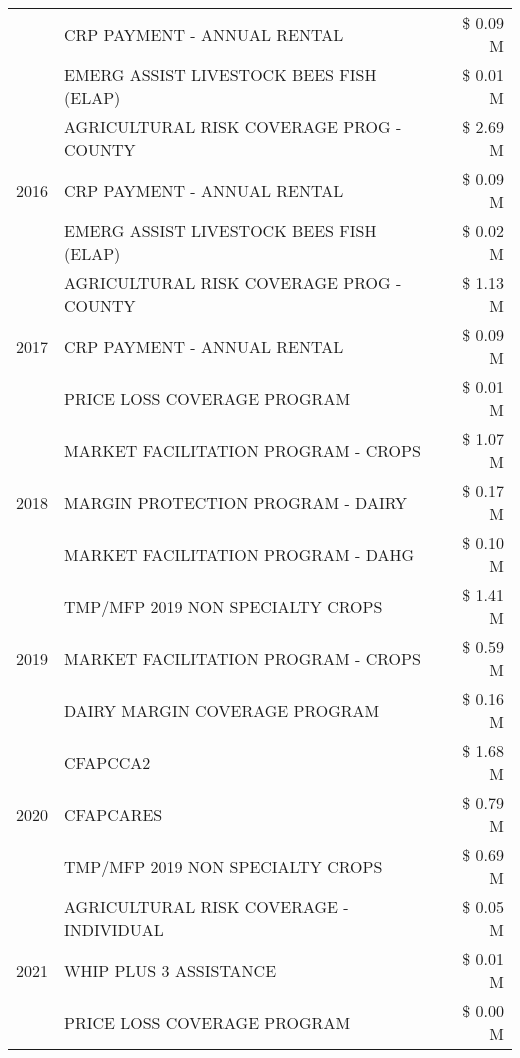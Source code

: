 \begin{tabular}{llr}
 & CRP PAYMENT - ANNUAL RENTAL & \$ 0.09 M \\
 & EMERG ASSIST LIVESTOCK BEES FISH (ELAP) & \$ 0.01 M \\
\cline{1-3}
\multirow[t]{3}{*}{2016} & AGRICULTURAL RISK COVERAGE PROG - COUNTY & \$ 2.69 M \\
 & CRP PAYMENT - ANNUAL RENTAL & \$ 0.09 M \\
 & EMERG ASSIST LIVESTOCK BEES FISH (ELAP) & \$ 0.02 M \\
\cline{1-3}
\multirow[t]{3}{*}{2017} & AGRICULTURAL RISK COVERAGE PROG - COUNTY & \$ 1.13 M \\
 & CRP PAYMENT - ANNUAL RENTAL & \$ 0.09 M \\
 & PRICE LOSS COVERAGE PROGRAM & \$ 0.01 M \\
\cline{1-3}
\multirow[t]{3}{*}{2018} & MARKET FACILITATION PROGRAM - CROPS & \$ 1.07 M \\
 & MARGIN PROTECTION PROGRAM - DAIRY & \$ 0.17 M \\
 & MARKET FACILITATION PROGRAM - DAHG & \$ 0.10 M \\
\cline{1-3}
\multirow[t]{3}{*}{2019} & TMP/MFP 2019 NON SPECIALTY CROPS & \$ 1.41 M \\
 & MARKET FACILITATION PROGRAM - CROPS & \$ 0.59 M \\
 & DAIRY MARGIN COVERAGE PROGRAM & \$ 0.16 M \\
\cline{1-3}
\multirow[t]{3}{*}{2020} & CFAPCCA2 & \$ 1.68 M \\
 & CFAPCARES & \$ 0.79 M \\
 & TMP/MFP 2019 NON SPECIALTY CROPS & \$ 0.69 M \\
\cline{1-3}
\multirow[t]{3}{*}{2021} & AGRICULTURAL RISK COVERAGE - INDIVIDUAL & \$ 0.05 M \\
 & WHIP PLUS 3 ASSISTANCE & \$ 0.01 M \\
 & PRICE LOSS COVERAGE PROGRAM & \$ 0.00 M \\
\cline{1-3}
\bottomrule
\end{tabular}
